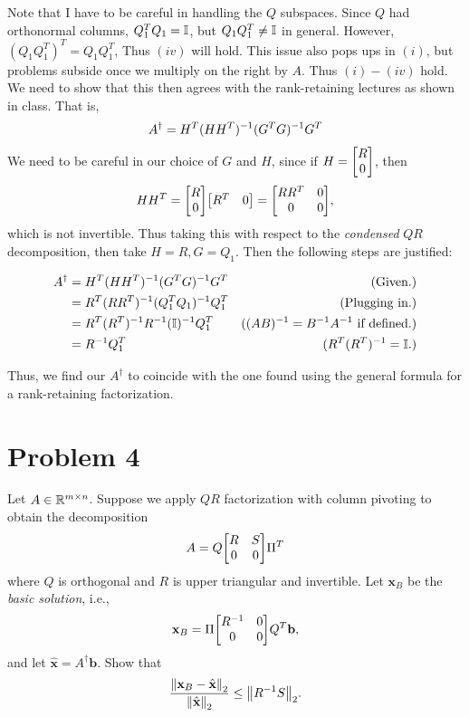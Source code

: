 \begin{solution}
    Note that I have to be careful in handling the $Q$ subspaces. Since $Q$ had orthonormal columns, $Q_1^T Q_1 = \mathbb{I}$, but $Q_1Q_1^T \neq \mathbb{I}$ in general. However, $(Q_1Q_1^T)^T = Q_1Q_1^T$, Thus $(iv)$ will hold. This issue also pops ups in $(i)$, but problems subside once we multiply on the right by $A$. Thus $(i) - (iv)$ hold. We need to show that this then agrees with the rank-retaining lectures as shown in class. That is, 
    \[
    A^\dag = H^T(HH^T)^{-1} (G^TG)^{-1} G^T
    \]
    We need to be careful in our choice of $G$ and $H$, since if $H = \mqty[R\\0]$, then 
    \[
    HH^T = \mqty[R\\0]\mqty[R^T&0] =\mqty[RR^T &0\\0&0],
    \]
    which is not invertible. Thus taking this with respect to the \textit{condensed} $QR$ decomposition, then take $H = R, G = Q_1$. Then the following steps are justified:

    \alignbreak
    \begin{align*}
        A^\dag &= H^T(HH^T)^{-1} (G^TG)^{-1} G^T &\text{(Given.)}\\
        &= R^T(RR^T)^{-1} (Q_1^TQ_1)^{-1} Q_1^T &\text{(Plugging in.)}\\
        &= R^T(R^T)^{-1} R^{-1} (\mathbb{I})^{-1} Q_1^T &\text{($(AB)^{-1} = B^{-1} A^{-1}$ if defined.)}\\
        &= R^{-1} Q_1^T &(R^T(R^T)^{-1} = \mathbb{I}.)
    \end{align*}
    \alignbreak

    Thus, we find our $A^\dag$ to coincide with the one found using the general formula for a rank-retaining factorization.
\end{solution}

\newpage
\section{Problem 4}
Let $A \in \mathbb{R}^{m \times n}$. Suppose we apply $QR$ factorization with column pivoting to obtain the decomposition
\[
A = Q\mqty[R&S\\0&0]\Pi^T
\]
where $Q$ is orthogonal and $R$ is upper triangular and invertible. Let $\textbf{x}_B$ be the \textit{basic solution}, i.e.,
\[
\textbf{x}_B = \Pi \mqty[R^\inv &0\\0&0]Q^T\textbf{b},
\]
and let $\hat{\textbf{x}} = A^\dag \textbf{b}.$ Show that 
\[
\frac{\norm{\textbf{x}_B - \hat{\textbf{x}}}_2}{\norm{\hat{\textbf{x}}}_2} \leq \norm{R^{-1} S}_2.
\]
\partbreak
\begin{solution}
    
\end{solution}


